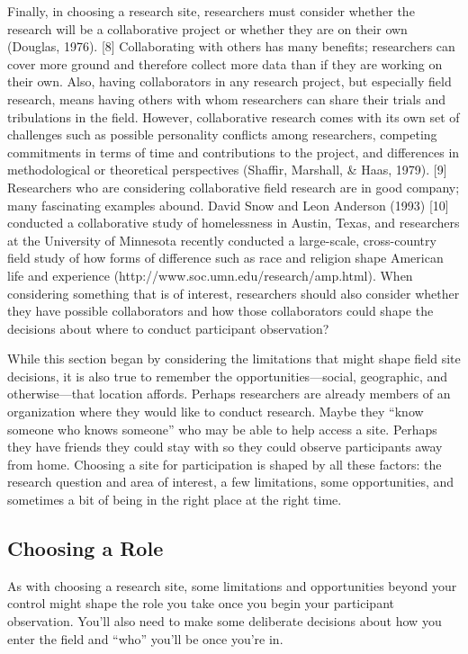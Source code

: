 Finally, in choosing a research site, researchers must consider whether the research will be a collaborative project or whether they are on their own (Douglas, 1976). [8] Collaborating with others has many benefits; researchers can cover more ground and therefore collect more data than if they are working on their own. Also, having collaborators in any research project, but especially field research, means having others with whom researchers can share their trials and tribulations in the field. However, collaborative research comes with its own set of challenges such as possible personality conflicts among researchers, competing commitments in terms of time and contributions to the project, and differences in methodological or theoretical perspectives (Shaffir, Marshall, \& Haas, 1979). [9] Researchers who are considering collaborative field research are in good company; many fascinating examples abound. David Snow and Leon Anderson (1993) [10] conducted a collaborative study of homelessness in Austin, Texas, and researchers at the University of Minnesota recently conducted a large-scale, cross-country field study of how forms of difference such as race and religion shape American life and experience (http://www.soc.umn.edu/research/amp.html). When considering something that is of interest, researchers should also consider whether they have possible collaborators and how those collaborators could shape the decisions about where to conduct participant observation?

While this section began by considering the limitations that might shape field site decisions, it is also true to remember the opportunities—social, geographic, and otherwise—that location affords. Perhaps researchers are already members of an organization where they would like to conduct research. Maybe they ``know someone who knows someone'' who may be able to help access a site. Perhaps they have friends they could stay with so they could observe participants away from home. Choosing a site for participation is shaped by all these factors: the research question and area of interest, a few limitations, some opportunities, and sometimes a bit of being in the right place at the right time.

\subsection{Choosing a Role}

As with choosing a research site, some limitations and opportunities beyond your control might shape the role you take once you begin your participant observation. You’ll also need to make some deliberate decisions about how you enter the field and ``who'' you’ll be once you’re in.

